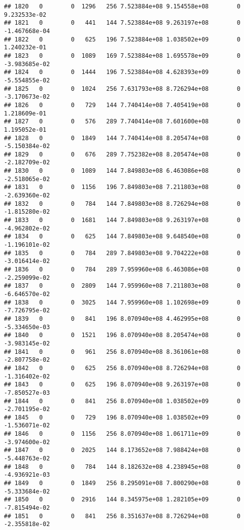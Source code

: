 \documentclass[
]{article}
\begin{document}
\begin{enumerate}
\begin{verbatim}
## 1820   0        0  1296   256 7.523884e+08 9.154558e+08        0  9.232533e-02
## 1821   0        0   441   144 7.523884e+08 9.263197e+08        0 -1.467668e-04
## 1822   0        0   625   196 7.523884e+08 1.038502e+09        0  1.240232e-01
## 1823   0        0  1089   169 7.523884e+08 1.695578e+09        0 -3.983685e-02
## 1824   0        0  1444   196 7.523884e+08 4.628393e+09        0 -5.554855e-02
## 1825   0        0  1024   256 7.631793e+08 8.726294e+08        0 -3.170673e-02
## 1826   0        0   729   144 7.740414e+08 7.405419e+08        0  1.218609e-01
## 1827   0        0   576   289 7.740414e+08 7.601600e+08        0  1.195052e-01
## 1828   0        0  1849   144 7.740414e+08 8.205474e+08        0 -5.150384e-02
## 1829   0        0   676   289 7.752382e+08 8.205474e+08        0 -2.182709e-02
## 1830   0        0  1089   144 7.849803e+08 6.463086e+08        0 -2.518065e-02
## 1831   0        0  1156   196 7.849803e+08 7.211803e+08        0 -2.639360e-02
## 1832   0        0   784   144 7.849803e+08 8.726294e+08        0 -1.815280e-02
## 1833   0        0  1681   144 7.849803e+08 9.263197e+08        0 -4.962802e-02
## 1834   0        0   625   144 7.849803e+08 9.648540e+08        0 -1.196101e-02
## 1835   0        0   784   289 7.849803e+08 9.704222e+08        0 -3.016414e-02
## 1836   0        0   784   289 7.959960e+08 6.463086e+08        0 -2.259099e-02
## 1837   0        0  2809   144 7.959960e+08 7.211803e+08        0 -6.646570e-02
## 1838   0        0  3025   144 7.959960e+08 1.102698e+09        0 -7.726795e-02
## 1839   0        0   841   196 8.070940e+08 4.462995e+08        0 -5.334650e-03
## 1840   0        0  1521   196 8.070940e+08 8.205474e+08        0 -3.983145e-02
## 1841   0        0   961   256 8.070940e+08 8.361061e+08        0 -2.807758e-02
## 1842   0        0   625   256 8.070940e+08 8.726294e+08        0 -1.316402e-02
## 1843   0        0   625   196 8.070940e+08 9.263197e+08        0 -7.850527e-03
## 1844   0        0   841   256 8.070940e+08 1.038502e+09        0 -2.701195e-02
## 1845   0        0   729   196 8.070940e+08 1.038502e+09        0 -1.536071e-02
## 1846   0        0  1156   256 8.070940e+08 1.061711e+09        0 -3.974600e-02
## 1847   0        0  2025   144 8.173652e+08 7.988424e+08        0 -5.448763e-02
## 1848   0        0   784   144 8.182632e+08 4.238945e+08        0 -4.936921e-03
## 1849   0        0  1849   256 8.295091e+08 7.800290e+08        0 -5.333684e-02
## 1850   0        0  2916   144 8.345975e+08 1.282105e+09        0 -7.815494e-02
## 1851   0        0   841   256 8.351637e+08 8.726294e+08        0 -2.355818e-02

\end{verbatim}
\end{enumerate}
\end{document}

